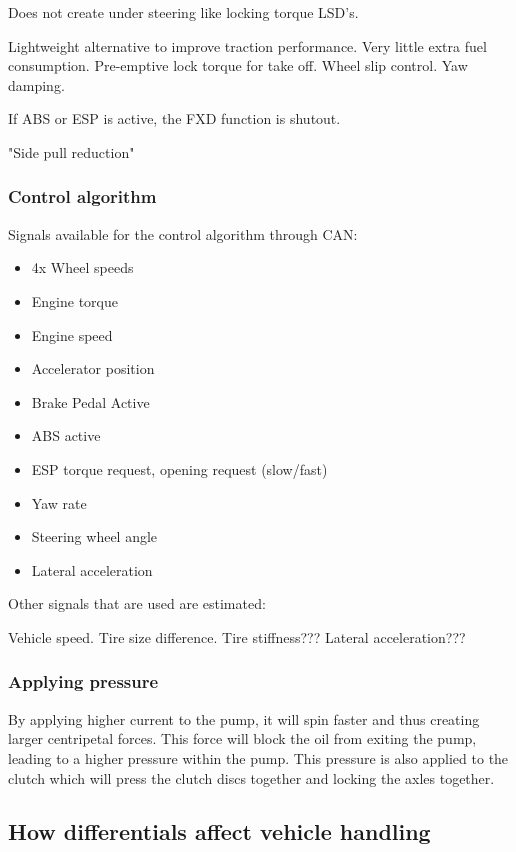 Does not create under steering like locking torque LSD's. 

Lightweight alternative  to improve traction performance. Very little extra fuel consumption. Pre-emptive lock torque for take off. Wheel slip control. Yaw damping. 

If ABS or ESP is active, the FXD function is shutout. 

"Side pull reduction"


\subsubsection{Control algorithm}

Signals available for the control algorithm through CAN:
\begin{itemize}
	\item 4x Wheel speeds
	\item Engine torque
	\item Engine speed
	\item Accelerator position
	\item Brake Pedal Active
	\item ABS active
	\item ESP torque request, opening request (slow/fast)
	\item Yaw rate
	\item Steering wheel angle
	\item Lateral acceleration
\end{itemize}

Other signals that are used are estimated:

Vehicle speed.
Tire size difference.
Tire stiffness???
Lateral acceleration???



\subsubsection{Applying pressure}

By applying higher current to the pump, it will spin faster and thus creating larger centripetal forces. This force will block the oil from exiting the pump, leading to a higher pressure within the pump. This pressure is also applied to the clutch which will press the clutch discs together and locking the axles together.

\subsection{How differentials affect vehicle handling} 

